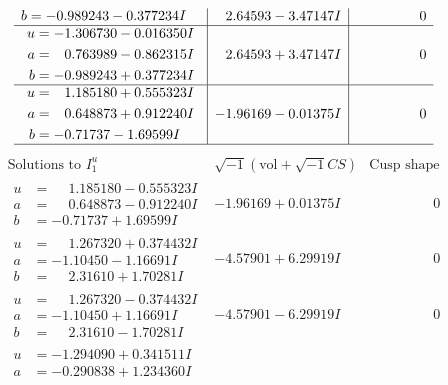\documentclass[1p]{elsarticle_modified}
\theoremstyle{definition}
\newcommand{\I}{\sqrt{-1}}
\begin{document}
$$\begin{array}{c|c|c}
\begin{aligned}
b &= -0.989243 - 0.377234 I\end{aligned}
 & \phantom{-}2.64593 - 3.47147 I & \phantom{-0.000000 } 0 \\ \hline\begin{aligned}
u &= -1.306730 - 0.016350 I \\
a &= \phantom{-}0.763989 - 0.862315 I \\
b &= -0.989243 + 0.377234 I\end{aligned}
 & \phantom{-}2.64593 + 3.47147 I & \phantom{-0.000000 } 0 \\ \hline\begin{aligned}
u &= \phantom{-}1.185180 + 0.555323 I \\
a &= \phantom{-}0.648873 + 0.912240 I \\
b &= -0.71737 - 1.69599 I\end{aligned}
 & -1.96169 - 0.01375 I & \phantom{-0.000000 } 0\\
 \hline 
 \end{array}$$\newpage$$\begin{array}{c|c|c}  
\text{Solutions to }I^u_{1}& \I (\text{vol} + \sqrt{-1}CS) & \text{Cusp shape}\\
 \hline 
\begin{aligned}
u &= \phantom{-}1.185180 - 0.555323 I \\
a &= \phantom{-}0.648873 - 0.912240 I \\
b &= -0.71737 + 1.69599 I\end{aligned}
 & -1.96169 + 0.01375 I & \phantom{-0.000000 } 0 \\ \hline\begin{aligned}
u &= \phantom{-}1.267320 + 0.374432 I \\
a &= -1.10450 - 1.16691 I \\
b &= \phantom{-}2.31610 + 1.70281 I\end{aligned}
 & -4.57901 + 6.29919 I & \phantom{-0.000000 } 0 \\ \hline\begin{aligned}
u &= \phantom{-}1.267320 - 0.374432 I \\
a &= -1.10450 + 1.16691 I \\
b &= \phantom{-}2.31610 - 1.70281 I\end{aligned}
 & -4.57901 - 6.29919 I & \phantom{-0.000000 } 0 \\ \hline\begin{aligned}
u &= -1.294090 + 0.341511 I \\
a &= -0.290838 + 1.234360 I \\

\end{aligned}
\end{array}$$
\end{document}
